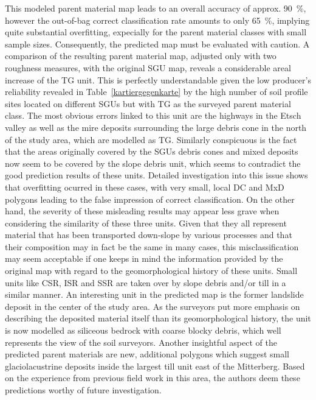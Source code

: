 \documentclass[preprint,12pt,authoryear]{elsarticle}
\begin{document}
This modeled parent material map leads to an overall accuracy of approx. 90~\%, however the out-of-bag correct classification rate amounts to only 65~\%, implying quite substantial overfitting, expecially for the parent material classes with small sample sizes. Consequently, the predicted map must be evaluated with caution. A comparison of the resulting parent material map, adjusted only with two roughness measures, with the original SGU map, reveals a considerable areal increase of the TG unit. This is perfectly understandable given the low producer's reliability revealed in Table~\ref{kartiergegenkarte} by the high number of soil profile sites located on different SGUs but with TG as the surveyed parent material class.  The most obvious errors linked to this unit are the highways in the Etsch valley as well as the mire deposits surrounding the large debris cone in the north of the study area, which are modelled as TG. Similarly conspicuous is the fact that the areas originally covered by the SGUs debris cones and mixed deposits now seem to be covered by the slope debris unit, which seems to contradict the good prediction results of these units. Detailed investigation into this issue shows that overfitting ocurred in these cases, with very small, local DC and MxD polygons leading to the false impression of correct classification. On the other hand, the severity of these misleading results may appear less grave when  considering the similarity of these three units. Given that they all represent material that has been transported down-slope by various processes and that their composition may in fact be the same in many cases, this misclassification may seem acceptable if one keeps in mind the information provided by the original map with regard to the geomorphological history of these units. Small units like CSR, ISR and SSR are taken over by slope debris and/or till in a similar manner. An interesting unit in the predicted map is the former landslide deposit in the center of the study area. As the surveyors put more emphasis on describing the deposited material itself than its geomorphological history, the unit is now modelled as siliceous bedrock with coarse blocky debris, which well represents the view of the soil surveyors.  Another insightful aspect of the predicted parent materials are new, additional polygons which suggest small glaciolacustrine deposits inside the largest till unit east of the Mitterberg. Based on the experience from previous field work in this area, the authors deem these predictions worthy of future investigation.
\end{document}

